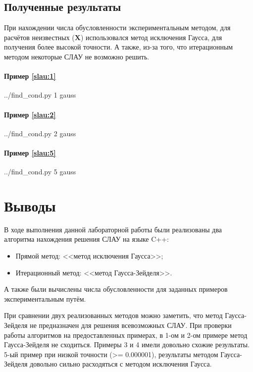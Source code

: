 \documentclass[a4paper]{article}
\newcommand{\m}[1]{\ensuremath{\bm{#1}}}
\begin{document}
\subsection{Полученные результаты}

При нахождении числа обусловленности экспериментальным методом, для расчётов неизвестных ($\m{X}$) использовался метод исключения Гаусса, для получения более высокой точности. А также, из-за того, что итерационным методом некоторые СЛАУ не возможно решить.

\paragraph{Пример \eqref{slau:1}}
\bash[stdout]
../find_cond.py 1 gauss
\END

\paragraph{Пример \eqref{slau:2}}
\bash[stdout]
../find_cond.py 2 gauss
\END

\paragraph{Пример \eqref{slau:5}}
\bash[stdout]
../find_cond.py 5 gauss
\END

\section{Выводы}
В ходе выполнения данной лабораторной работы были реализованы два алгоритма нахождения решения СЛАУ на языке C++:
\begin{itemize}
    \item Прямой метод: <<метод исключения Гаусса>>;
    \item Итерационный метод: <<метод Гаусса-Зейделя>>.
\end{itemize}
А также были вычислены числа обусловленности для заданных примеров экспериментальным путём.

\bigskip

При сравнении двух реализованных методов можно заметить, что метод Гаусса-Зейделя не предназначен для решения всевозможных СЛАУ.
При проверки работы алгоритмов на предоставленных примерах, в 1-ом и 2-ом примере метод Гаусса-Зейделя не сходиться. Примеры 3 и 4 имели довольно схожие результаты.
5-ый пример при низкой точности (>= 0.000001), результаты методом Гаусса-Зейделя довольно сильно расходяться с методом исключения Гаусса. 
\end{document}
